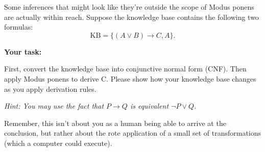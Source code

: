 \item {}
Some inferences that might look like they're outside the scope of Modus ponens
are actually within reach. Suppose the knowledge base contains the following two
formulas:
\[\text{KB} = \{ (A \vee B) \to C, A  \}.\]

{\bf Your task:}

First, convert the knowledge base into conjunctive normal form (CNF). Then apply
Modus ponens to derive C. Please show how your knowledge base changes as you
apply derivation rules.

{\em Hint: You may use the fact that $P \to Q$ is equivalent $\neg P \vee Q$.

Remember, this isn't about you as a human being able to arrive at the
conclusion, but rather about the rote application of a small set of
transformations (which a computer could execute).}
